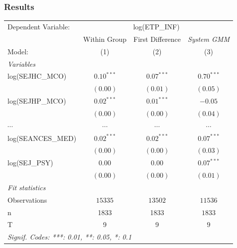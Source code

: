 \documentclass[10pt,mathserif,aspectratio=169]{beamer}
\begin{document}
\begin{frame}
  \frametitle{Results}
  \begin{table}\fontsize{6pt}{8pt}\selectfont
    \begingroup
    \centering
    \begin{tabular}{lccc}
      \tabularnewline \midrule \midrule
      Dependent Variable: & \multicolumn{3}{c}{log(ETP\_INF)}                                          \\
                          & Within Group                      & First Difference & \textit{System GMM} \\
      Model:              & (1)                               & (2)              & (3)                 \\
      \midrule
      \emph{Variables}                                                                                 \\
      log(SEJHC\_MCO)     & $0.10^{***}$                      & $0.07^{***}$     & $0.70^{***}$        \\
                          & $(0.00)$                          & $(0.01)$         & $(0.05)$            \\
      log(SEJHP\_MCO)     & $0.02^{***}$                      & $0.01^{***}$     & $-0.05$             \\
                          & $(0.00)$                          & $(0.00)$         & $(0.04)$            \\
      $\cdots$            & $\cdots$                          & $\cdots$         & $\cdots$            \\
      log(SEANCES\_MED)   & $0.02^{***}$                      & $0.02^{***}$     & $0.07^{***}$        \\
                          & $(0.00)$                          & $(0.00)$         & $(0.03)$            \\

      log(SEJ\_PSY)       & $0.00$                            & $0.00$           & $0.07^{***}$        \\  & $(0.00)$ & $(0.00)$ &
      $(0.01)$                                                                                         \\ \midrule \emph{Fit statistics} \\ Observations & $15335$                     & $13502$
                          & $11536$                                                                    \\

      n                   & 1833                              & 1833             & $1833$              \\ T & 9 & 9 & $9$ \\ \midrule \midrule
      \multicolumn{4}{l}{\emph{Signif. Codes: ***: 0.01, **: 0.05, *: 0.1}}                            \\
    \end{tabular}
    \par\endgroup
  \end{table}
\end{frame}
\end{document}
